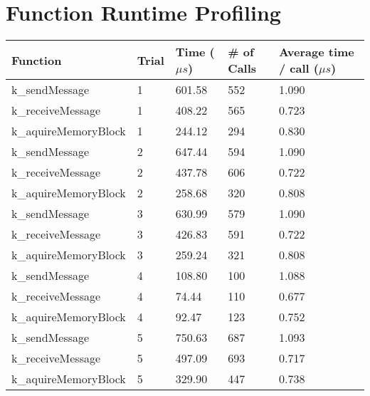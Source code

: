 \documentclass[12pt]{report}
\begin{document}
\section{Function Runtime Profiling}
\begin{tabular}{l | l | l | l | l}
    Function & Trial & Time ($\mu s$) & \# of Calls & Average time / call ($\mu s$) \\
    \hline
    k\_sendMessage&1&601.58&552&1.090 \\
    k\_receiveMessage&1&408.22&565&0.723 \\
    k\_aquireMemoryBlock&1&244.12&294&0.830 \\
    k\_sendMessage&2&647.44&594&1.090 \\
    k\_receiveMessage&2&437.78&606&0.722 \\
    k\_aquireMemoryBlock&2&258.68&320&0.808 \\
    k\_sendMessage&3&630.99&579&1.090 \\
    k\_receiveMessage&3&426.83&591&0.722 \\
    k\_aquireMemoryBlock&3&259.24&321&0.808 \\
    k\_sendMessage&4&108.80&100&1.088 \\
    k\_receiveMessage&4&74.44&110&0.677 \\
    k\_aquireMemoryBlock&4&92.47&123&0.752 \\
    k\_sendMessage&5&750.63&687&1.093 \\
    k\_receiveMessage&5&497.09&693&0.717 \\
    k\_aquireMemoryBlock&5&329.90&447&0.738 \\
\end{tabular}
\end{document}
